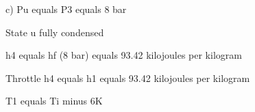 c) Pu equals P3 equals 8 bar

State u fully condensed

h4 equals hf (8 bar) equals 93.42 kilojoules per kilogram

Throttle h4 equals h1 equals 93.42 kilojoules per kilogram

T1 equals Ti minus 6K